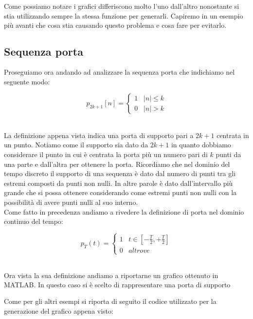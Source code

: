 \documentclass[../main.tex]{subfiles}
\begin{document}

Come possiamo notare i grafici differiscono molto l'uno dall'altro nonostante si stia utilizzando sempre la stessa funzione per generarli. Capiremo in un esempio più avanti che cosa stia causando questo problema e cosa fare per evitarlo.

\subsection{Sequenza porta}

Proseguiamo ora andando ad analizzare la sequenza porta che indichiamo nel seguente modo:

\[ p_{2k+1}[n] = \begin{cases}
	1 \hspace{10pt} |n| \leq k \\
	0 \hspace{10pt} |n| > k 
\end{cases} \]\

La definizione appena vista indica una porta di supporto pari a $2k + 1$ centrata in un punto. Notiamo come il supporto sia dato da $2k + 1$ in quanto dobbiamo considerare il punto in cui è centrata la porta più un numero pari di $k$ punti da una parte e dall'altra per ottenere la porta. Ricordiamo che nel dominio del tempo discreto il supporto di una sequenza è dato dal numero di punti tra gli estremi composti da punti non nulli. In altre parole è dato dall'intervallo più grande che si possa ottenere considerando come estremi punti non nulli con la possibilità di avere punti nulli al suo interno.\\

Come fatto in precedenza andiamo a rivedere la definizione di porta nel dominio continuo del tempo:


\[ p_{T}(t) = \begin{cases}
	1 \hspace{10pt} t \in [-\tfrac{T}{2}, + \tfrac{T}{2}]\\
	0 \hspace{10pt} \unit{altrove}
\end{cases} \]\

Ora vista la sua definizione andiamo a riportarne un grafico ottenuto in MATLAB.
In questo caso si è scelto di rappresentare una porta di supporto %


Come per gli altri esempi si riporta di seguito il codice utilizzato per la generazione del grafico appena visto:
\end{document}
